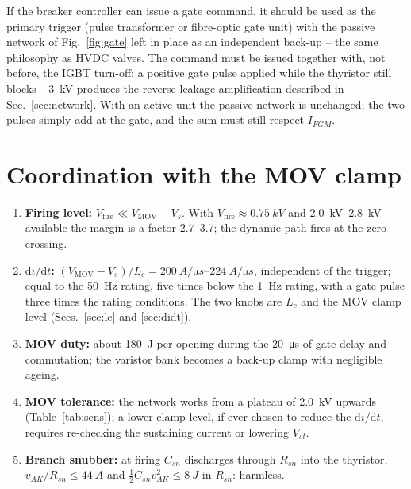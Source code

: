 \documentclass[11pt,a4paper]{article}
\begin{document}
If the breaker controller can issue a gate command, it should be used as the primary trigger
(pulse transformer or fibre-optic gate unit) with the passive network of Fig.~\ref{fig:gate} left
in place as an independent back-up -- the same philosophy as HVDC valves. The command must be
issued together with, not before, the IGBT turn-off: a positive gate pulse applied while the
thyristor still blocks \SI{-3}{kV} produces the reverse-leakage amplification described in
Sec.~\ref{sec:network}. With an active unit the passive network is unchanged; the two pulses
simply add at the gate, and the sum must still respect $I_{FGM}$.

\section{Coordination with the MOV clamp}

\begin{enumerate}
\item \textbf{Firing level:} $V_{\mathrm{fire}} \ll V_{\mathrm{MOV}} - V_s$. With
      $V_{\mathrm{fire}} \approx \SI{0.75}{kV}$ and \SIrange{2.0}{2.8}{kV} available the margin
      is a factor \numrange{2.7}{3.7}; the dynamic path fires at the zero crossing.
\item \textbf{$\mathrm{d}i/\mathrm{d}t$:} $(V_{\mathrm{MOV}} - V_s)/L_c = \SIrange{200}{224}{A/\micro s}$,
      independent of the trigger; equal to the \SI{50}{Hz} rating, five times below the
      \SI{1}{Hz} rating, with a gate pulse three times the rating conditions. The two
      knobs are $L_c$ and the MOV clamp level (Secs.~\ref{sec:lc} and \ref{sec:didt}).
\item \textbf{MOV duty:} about \SI{180}{J} per opening during the \SI{20}{\micro s} of gate delay
      and commutation; the varistor bank becomes a back-up clamp with negligible ageing.
\item \textbf{MOV tolerance:} the network works from a plateau of \SI{2.0}{kV} upwards
      (Table~\ref{tab:sens}); a lower clamp level, if ever chosen to reduce the
      $\mathrm{d}i/\mathrm{d}t$, requires re-checking the sustaining current or lowering $V_{st}$.
\item \textbf{Branch snubber:} at firing $C_{sn}$ discharges through $R_{sn}$ into the thyristor,
      $v_{AK}/R_{sn} \le \SI{44}{A}$ and $\tfrac12 C_{sn} v_{AK}^2 \le \SI{8}{J}$ in $R_{sn}$:
      harmless.
\end{enumerate}
\end{document}
